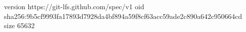 version https://git-lfs.github.com/spec/v1
oid sha256:9b5cf9993fa17893d7928da4bf894a59f8cf63acc59ade2c890a642c950664cd
size 65632
